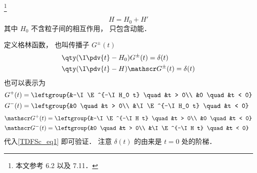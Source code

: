 
\footnote{本文参考 \cite{Newton} 6.2 以及 \cite{Sakurai} 7.11．}

\begin{equation}
H = H_0 + H'
\end{equation}
其中 $H_0$ 不含粒子间的相互作用， 只包含动能．

定义格林函数， 也叫传播子 $G^\pm(t)$
\begin{equation}\label{TDFSc_eq1}
\begin{aligned}
&\qty(\I\pdv{t} - H_0)G^\pm (t) = \delta(t)\\
&\qty(\I\pdv{t} - H)\mathscr G^\pm (t) = \delta(t)
\end{aligned}
\end{equation}
也可以表示为
\begin{equation}
\begin{aligned}
&G^+(t) = \leftgroup{&-\I \E^{-\I H_0 t} \quad &t > 0\\
&0 \quad &t < 0}\\
&G^-(t) = \leftgroup{&0 \quad &t > 0\\
&\I \E^{-\I H_0 t} \quad &t < 0}
\end{aligned}
\end{equation}
\begin{equation}
\begin{aligned}
&\mathscr G^+(t) = \leftgroup{&-\I \E^{-\I H t} \quad &t > 0\\
&0 \quad &t < 0}\\
&\mathscr G^-(t) = \leftgroup{&0 \quad &t > 0\\
&\I \E^{-\I H t} \quad &t < 0}
\end{aligned}
\end{equation}
代入\autoref{TDFSc_eq1} 即可验证． 注意 $\delta(t)$ 的由来是 $t=0$ 处的阶梯．
